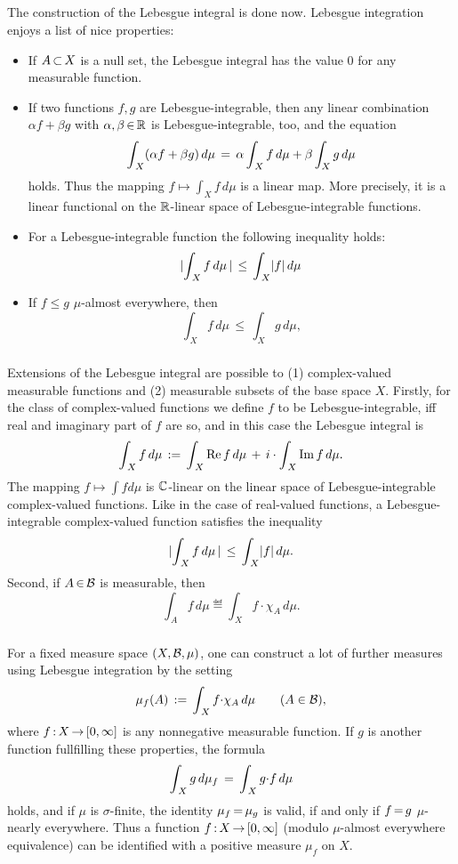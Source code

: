 \documentclass[11pt,twoside]{article}
\begin{document}
\subparagraph{}
The construction of the Lebesgue integral is done now.
Lebesgue integration enjoys a list of nice properties:

\begin{itemize}[leftmargin=22pt]
\item[1.]
If $A \xsubset X$ is a null set,
the Lebesgue integral has the value $0$ for any measurable function.

\item[2.]
If two functions $f,g$ are Lebesgue-integrable,
then any linear combination $\alpha f + \beta g$ with $\alpha, \beta \xeof \R$
is Lebesgue-integrable, too, and the equation
\[
\int_{\,X} (\alpha f + \beta g) \, d \mu
\=
\alpha \int_{\,X}  f \, d \mu + \beta \int_{X}  g \, d \mu
\]
holds.
Thus the mapping $f \mapsto \int_{X} f \, d \mu$ is a linear map.
More precisely, it is  a linear functional
on the $\R$-linear space of Lebesgue-integrable functions.

\item[3.]
For a Lebesgue-integrable function the following inequality holds:
\[
\abs{\int_{\,X} f \, d\mu \,} \, \leq \, \int_{\,X} \abs{f} \, d\mu \,
\]

\item[4.]
If $f \leq g$ $\mu$-almost everywhere, then
\[
\int_{\,X} f \, d\mu \, \leq \, \int_{X} g \, d\mu,
\]
\end{itemize}

\subparagraph{}
Extensions of the Lebesgue integral are possible to
(1) complex-valued measurable functions and
(2) measurable subsets of the base space $X$.
Firstly,
for the class of complex-valued functions
we define $f$ to be Lebesgue-integrable,
iff real and imaginary part of $f$ are so,
and in this case the Lebesgue integral is
\[
\int_{\,X} f \, d \mu
\eqdef
\int_{\,X} \re f \, d \mu
\+
i \cdot \int_{\,X} \im f \, d \mu.
\]
The mapping $f \mapsto \int f d\mu$ is $\C$-linear on the linear space
of Lebesgue-integrable complex-valued functions.
Like in the case of real-valued functions,
a Lebesgue-integrable complex-valued function satisfies the inequality
\[
\abs{\int_{\,X}      f  \, d\mu \,} \, \leq \,
     \int_{\,X} \abs{f} \, d\mu.
\]
Second,
if $A \xeof \salgB$ is measurable, then
\[
\int_{\,A} f \, d\mu \eqdef \int_{\,X} f {\cdot} \chi_A \, d\mu.
\]

\subparagraph{}
For a fixed measure space $(X,\salgB,\mu)$,
one can construct a lot of further measures using Lebesgue integration
by the setting
\[
\mu_f(A) \eqdef \int_{\,X} f {\cdot} \chi_A \, d \mu \qquad (A \in \salgB),
\]
where $f \: X \xto [0,\infty]$ is any nonnegative measurable function.
If $g$ is another function fullfilling these properties,
the formula
\[
\int_{\,X} g \, d \mu_f \= \int_{\,X} g {\cdot} f \, d \mu
\]
holds,
and if $\mu$ is $\sigma$-finite, the identity $\mu_f \eq \mu_g$ is valid,
if and only if
$f \eq g$ $\mu$-nearly everywhere.
Thus a function $f \: X \xto [0,\infty]$
(modulo $\mu$-almost everywhere equivalence)
can be identified with a positive measure $\mu_f$ on $X$.
\end{document}
